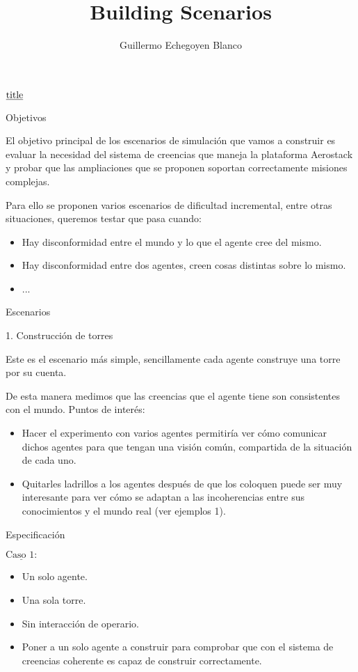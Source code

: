 \documentclass[12pt]{report}
\title{\textbf{Building Scenarios}}
\author{Guillermo Echegoyen Blanco}
\makeatletter
\newcommand{\textunderline}[1]{$\underline{\mbox{#1}}$} %
\newcommand{\mktitle}[1]{{\Large {\color{NavyBlue} #1}}}
\newcommand{\mksection}[1]{{\large {\color{NavyBlue} #1}}}
\let\thetitle\@title
\let\theauthor\@author
\let\thedate\@date
\newcommand{\insertheader}{
  {
    \centering
    \mktitle{
      \textunderline{\thetitle} \par
      \theauthor \par
      \thedate
    }
    \par
  }
}
\makeatother
\begin{document}
\insertheader

\mksection{Objetivos}

  El objetivo principal de los escenarios de simulaci\'on que vamos a construir es evaluar la necesidad del sistema de creencias que maneja la plataforma Aerostack y probar que las ampliaciones que se proponen soportan correctamente misiones complejas.

  Para ello se proponen varios escenarios de dificultad incremental, entre otras situaciones, queremos testar que pasa cuando:
  \begin{itemize}
    \item Hay disconformidad entre el mundo y lo que el agente cree del mismo.
    \item Hay disconformidad entre dos agentes, creen cosas distintas sobre lo mismo.
    \item ...
  \end{itemize}

\mksection{Escenarios}

\mksection{\normalsize{1. Construcci\'on de torres}}

  Este es el escenario m\'as simple, sencillamente cada agente construye una torre por su cuenta.

  De esta manera medimos que las creencias que el agente tiene son consistentes con el mundo. Puntos de inter\'es:

  \begin{itemize}
    \item Hacer el experimento con varios agentes permitir\'ia ver c\'omo comunicar dichos agentes para que tengan una visi\'on com\'un, compartida de la situaci\'on de cada uno.
    \item Quitarles ladrillos a los agentes despu\'es de que los coloquen puede ser muy interesante para ver c\'omo se adaptan a las incoherencias entre sus conocimientos y el mundo real (ver ejemplos 1).
  \end{itemize}

\clearpage
\mksection{\normalsize{Especificaci\'on}}

  \textunderline{Caso 1:}
    \begin{itemize}
      \item Un solo agente.
      \item Una sola torre.
      \item Sin interacci\'on de operario.
      \item Poner a un solo agente a construir para comprobar que con el sistema de creencias coherente es capaz de construir correctamente.
    \end{itemize}
\end{document}
